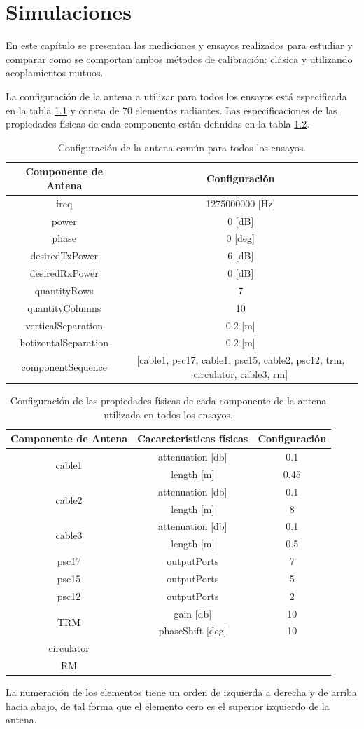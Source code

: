 \chapter{Simulaciones}

En este capítulo se presentan las mediciones y ensayos realizados para estudiar y comparar como se comportan ambos métodos de
calibración: clásica y utilizando acoplamientos mutuos.

La configuración de la antena a utilizar para todos los ensayos está especificada en la tabla \ref{tab:configurationUsed} y 
consta de 70 elementos radiantes. Las especificaciones de las propiedades físicas de cada componente están definidas en la 
tabla \ref{tab:configurationOfComponents}.
\begin{table}[H]
  \footnotesize
  \centering
  \begin{tabular}{|c|c|}
	\hline
	\textbf{Componente de Antena} & \textbf{Configuración} \tabularnewline \hline 
	freq &  1275000000 [Hz] \tabularnewline\hline 
	power & 0 [dB] \tabularnewline \hline 
	phase & 0 [deg] \tabularnewline \hline 
	desiredTxPower & 6 [dB] \tabularnewline \hline 
	desiredRxPower & 0 [dB] \tabularnewline \hline 
	quantityRows & 7 \tabularnewline \hline 
	quantityColumns & 10 \tabularnewline \hline 
	verticalSeparation & 0.2 [m] \tabularnewline \hline 
	hotizontalSeparation & 0.2 [m] \tabularnewline \hline 
	componentSequence & [cable1, psc17, cable1, psc15, cable2, psc12, trm, circulator, cable3, rm] \tabularnewline \hline 
  \end{tabular}
  \caption{Configuración de la antena común para todos los ensayos.}
  \label{tab:configurationUsed}
\end{table}
\begin{table}[H]
  \footnotesize
  \centering
  \begin{tabular}{|c|c|c|}
	\hline
	\textbf{Componente de Antena} & \textbf{Cacarcterísticas físicas} & \textbf{Configuración} \tabularnewline \hline 
	\multirow{2}{*}{cable1} &  attenuation [db] & 0.1\tabularnewline \cline{2-3}
	 & length [m] & 0.45\tabularnewline \hline 
	\multirow{2}{*}{cable2} &  attenuation [db] & 0.1\tabularnewline \cline{2-3}
	 & length [m] & 8\tabularnewline \hline 
	\multirow{2}{*}{cable3} &  attenuation [db] & 0.1\tabularnewline \cline{2-3}
	 & length [m] & 0.5\tabularnewline \hline 
	psc17 & outputPorts & 7\tabularnewline \hline
	psc15 & outputPorts & 5\tabularnewline \hline
	psc12 & outputPorts & 2\tabularnewline \hline
	\multirow{2}{*}{TRM} & gain [db] & 10\tabularnewline \cline{2-3}
	 & phaseShift [deg] & 10\tabularnewline \hline 
	circulator & & \tabularnewline \hline 
	RM & & \tabularnewline \hline 
  \end{tabular}
  \caption{Configuración de las propiedades físicas de cada componente de la antena utilizada en todos los ensayos.}
  \label{tab:configurationOfComponents}
\end{table}
La numeración de los elementos tiene un orden de izquierda a derecha y de arriba hacia abajo, de tal forma que el elemento cero 
es el superior izquierdo de la antena.

